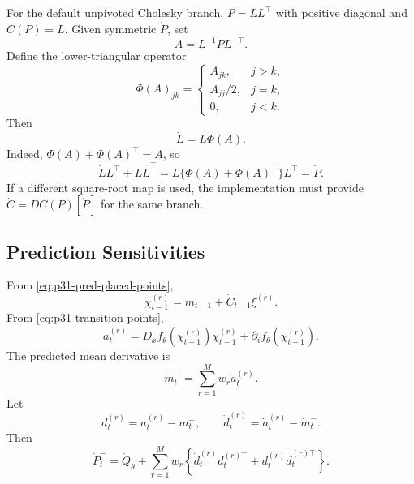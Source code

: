 \documentclass[11pt]{article}
\numberwithin{equation}{section}
\begin{document}
For the default unpivoted Cholesky branch, \(P=LL^\top\) with positive diagonal
and \(C(P)=L\).  Given symmetric \(\dot P\), set
\begin{equation}
  A=L^{-1}\dot P L^{-\top}.
  \label{eq:p31-chol-A}
\end{equation}
Define the lower-triangular operator
\begin{equation}
  \Phi(A)_{jk}
  =
  \begin{cases}
  A_{jk}, & j>k,\\
  A_{jj}/2, & j=k,\\
  0, & j<k.
  \end{cases}
  \label{eq:p31-chol-Phi}
\end{equation}
Then
\begin{equation}
  \dot L=L\Phi(A).
  \label{eq:p31-chol-derivative}
\end{equation}
Indeed, \(\Phi(A)+\Phi(A)^\top=A\), so
\begin{equation}
  \dot LL^\top+L\dot L^\top
  =
  L\{\Phi(A)+\Phi(A)^\top\}L^\top
  =
  \dot P.
  \label{eq:p31-chol-check}
\end{equation}
If a different square-root map is used, the implementation must provide
\(\dot C=DC(P)[\dot P]\) for the same branch.

\subsection{Prediction Sensitivities}

From \eqref{eq:p31-pred-placed-points},
\begin{equation}
  \dot\chi_{t-1}^{(r)}
  =
  \dot m_{t-1}+\dot C_{t-1}\xi^{(r)}.
  \label{eq:p31-dot-pred-place}
\end{equation}
From \eqref{eq:p31-transition-points},
\begin{equation}
  \dot a_t^{(r)}
  =
  D_xf_\theta(\chi_{t-1}^{(r)})\dot\chi_{t-1}^{(r)}
  +\partial_i f_\theta(\chi_{t-1}^{(r)}).
  \label{eq:p31-dot-transition}
\end{equation}
The predicted mean derivative is
\begin{equation}
  \dot m_t^-=\sum_{r=1}^M w_r\dot a_t^{(r)}.
  \label{eq:p31-dot-pred-mean}
\end{equation}
Let
\begin{equation}
  d_t^{(r)}=a_t^{(r)}-m_t^-,
  \qquad
  \dot d_t^{(r)}=\dot a_t^{(r)}-\dot m_t^-.
  \label{eq:p31-pred-centered}
\end{equation}
Then
\begin{equation}
  \dot P_t^-
  =
  \dot Q_\theta
  +
  \sum_{r=1}^M w_r
  \left\{
  \dot d_t^{(r)}d_t^{(r)\top}
  +d_t^{(r)}\dot d_t^{(r)\top}
  \right\}.
  \label{eq:p31-dot-pred-cov}
\end{equation}
\end{document}
